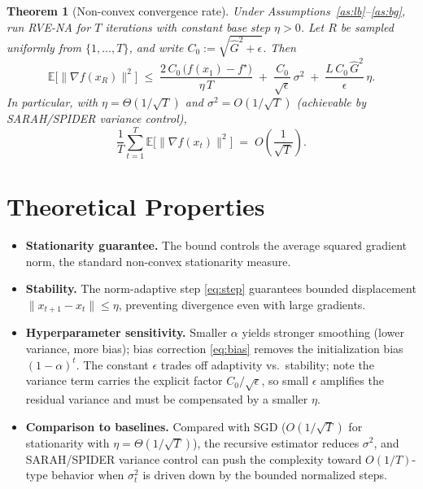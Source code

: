 \documentclass[11pt]{article}
\newtheorem{theorem}{Theorem}
\begin{document}
\begin{theorem}[Non-convex convergence rate]\label{thm:main}
Under Assumptions~\ref{as:lb}--\ref{as:bg}, run RVE-NA for $T$ iterations with
constant base step $\eta>0$. Let $R$ be sampled uniformly
from $\{1,\dots,T\}$, and write $C_0 := \sqrt{\hat G^2+\epsilon}$. Then
\[
\mathbb{E}\big[\|\nabla f(x_R)\|^2\big]
\;\le\;
\frac{2\,C_0\,\big(f(x_1)-f^\star\big)}{\eta\,T}
\;+\;
\frac{C_0}{\sqrt{\epsilon}}\,\sigma^2
\;+\;
\frac{L\,C_0\,\hat G^2}{\epsilon}\,\eta .
\]
In particular, with $\eta = \Theta(1/\sqrt{T})$ and $\sigma^2 = O(1/\sqrt{T})$ (achievable
by SARAH/SPIDER variance control),
\[
\frac{1}{T}\sum_{t=1}^T \mathbb{E}\big[\|\nabla f(x_t)\|^2\big]
\;=\; O\!\left(\frac{1}{\sqrt{T}}\right).
\]
\end{theorem}

\section*{Theoretical Properties}

\begin{itemize}
\item \textbf{Stationarity guarantee.} The bound controls the average squared gradient norm,
the standard non-convex stationarity measure.
\item \textbf{Stability.} The norm-adaptive step \eqref{eq:step} guarantees bounded
displacement $\|x_{t+1}-x_t\| \le \eta$, preventing divergence even with large gradients.
\item \textbf{Hyperparameter sensitivity.} Smaller $\alpha$ yields stronger smoothing
(lower variance, more bias); bias correction \eqref{eq:bias} removes the initialization bias
$(1-\alpha)^t$. The constant $\epsilon$ trades off adaptivity vs.\ stability; note the
variance term carries the explicit factor $C_0/\sqrt{\epsilon}$, so small $\epsilon$
amplifies the residual variance and must be compensated by a smaller $\eta$.
\item \textbf{Comparison to baselines.} Compared with SGD ($O(1/\sqrt{T})$ for stationarity
with $\eta=\Theta(1/\sqrt{T})$), the recursive estimator reduces $\sigma^2$, and SARAH/SPIDER
variance control can push the complexity toward $O(1/T)$-type behavior when $\sigma_t^2$ is
driven down by the bounded normalized steps.
\end{itemize}
\end{document}
